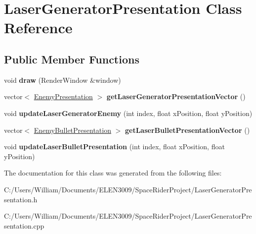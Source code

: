 \hypertarget{class_laser_generator_presentation}{}\section{Laser\+Generator\+Presentation Class Reference}
\label{class_laser_generator_presentation}
\subsection*{Public Member Functions}
\begin{DoxyCompactItemize}
\item 
\mbox{\label{class_laser_generator_presentation_a44a7cafde213e243cd0c6bf6f228d62c}} 
void {\bfseries draw} (Render\+Window \&window)
\item 
\mbox{\label{class_laser_generator_presentation_abf5511b6140870dc912ebd78026b4b26}} 
vector$<$ \hyperlink{class_enemy_presentation}{Enemy\+Presentation} $>$ {\bfseries get\+Laser\+Generator\+Presentation\+Vector} ()
\item 
\mbox{\label{class_laser_generator_presentation_a1f72a5e12d894fb4e2473bf3907359a2}} 
void {\bfseries update\+Laser\+Generator\+Enemy} (int index, float x\+Position, float y\+Position)
\item 
\mbox{\label{class_laser_generator_presentation_a96fd1b356d6d9558f2bf78f5bbe9f9a5}} 
vector$<$ \hyperlink{class_enemy_bullet_presentation}{Enemy\+Bullet\+Presentation} $>$ {\bfseries get\+Laser\+Bullet\+Presentation\+Vector} ()
\item 
\mbox{\label{class_laser_generator_presentation_a61063595265ba47e5db5061816cd0f08}} 
void {\bfseries update\+Laser\+Bullet\+Presentation} (int index, float x\+Position, float y\+Position)
\end{DoxyCompactItemize}


The documentation for this class was generated from the following files\+:\begin{DoxyCompactItemize}
\item 
C\+:/\+Users/\+William/\+Documents/\+E\+L\+E\+N3009/\+Space\+Rider\+Project/Laser\+Generator\+Presentation.\+h\item 
C\+:/\+Users/\+William/\+Documents/\+E\+L\+E\+N3009/\+Space\+Rider\+Project/Laser\+Generator\+Presentation.\+cpp\end{DoxyCompactItemize}
